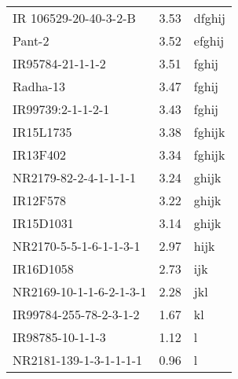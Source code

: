 \documentclass[]{article}
\begin{document}
\begin{longtable}{lll}
IR 106529-20-40-3-2-B & 3.53 & dfghij\\
\rowcolor{gray!6}  Pant-2 & 3.52 & efghij\\
IR95784-21-1-1-2 & 3.51 & fghij\\
\addlinespace
\rowcolor{gray!6}  Radha-13 & 3.47 & fghij\\
IR99739:2-1-1-2-1 & 3.43 & fghij\\
\rowcolor{gray!6}  IR15L1735 & 3.38 & fghijk\\
IR13F402 & 3.34 & fghijk\\
\rowcolor{gray!6}  NR2179-82-2-4-1-1-1-1 & 3.24 & ghijk\\
\addlinespace
IR12F578 & 3.22 & ghijk\\
\rowcolor{gray!6}  IR15D1031 & 3.14 & ghijk\\
NR2170-5-5-1-6-1-1-3-1 & 2.97 & hijk\\
\rowcolor{gray!6}  IR16D1058 & 2.73 & ijk\\
NR2169-10-1-1-6-2-1-3-1 & 2.28 & jkl\\
\addlinespace
\rowcolor{gray!6}  IR99784-255-78-2-3-1-2 & 1.67 & kl\\
IR98785-10-1-1-3 & 1.12 & l\\
\rowcolor{gray!6}  NR2181-139-1-3-1-1-1-1 & 0.96 & l\\
\bottomrule
\end{longtable}
\endgroup{}
\begingroup\fontsize{12}{14}\selectfont
\end{document}
